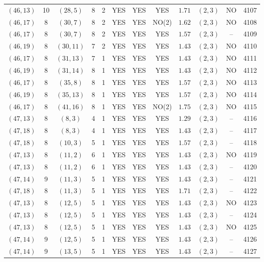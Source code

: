 \begin{longtable}{|c|c|c|c|c|c|c|c|c|c|c|c|}
$(46,13)$ & 10 & $(28,5)$ & 8 & 2 & YES & YES & YES & $1.71$ & $(2,3)$ & NO & 4107\\
$(46,17)$ & 8 & $(30,7)$ & 8 & 2 & YES & YES & NO(2) & $1.62$ & $(2,3)$ & NO & 4108\\
$(46,17)$ & 8 & $(30,7)$ & 8 & 2 & YES & YES & YES & $1.57$ & $(2,3)$ & -- & 4109\\
$(46,19)$ & 8 & $(30,11)$ & 7 & 2 & YES & YES & YES & $1.43$ & $(2,3)$ & NO & 4110\\
$(46,17)$ & 8 & $(31,13)$ & 7 & 1 & YES & YES & YES & $1.43$ & $(2,3)$ & NO & 4111\\
$(46,19)$ & 8 & $(31,14)$ & 8 & 1 & YES & YES & YES & $1.43$ & $(2,3)$ & NO & 4112\\
$(46,17)$ & 8 & $(35,8)$ & 8 & 1 & YES & YES & YES & $1.57$ & $(2,3)$ & NO & 4113\\
$(46,19)$ & 8 & $(35,13)$ & 8 & 1 & YES & YES & YES & $1.57$ & $(2,3)$ & NO & 4114\\
$(46,17)$ & 8 & $(41,16)$ & 8 & 1 & YES & YES & NO(2) & $1.75$ & $(2,3)$ & NO & 4115\\
$(47,13)$ & 8 & $(8,3)$ & 4 & 1 & YES & YES & YES & $1.29$ & $(2,3)$ & -- & 4116\\
$(47,18)$ & 8 & $(8,3)$ & 4 & 1 & YES & YES & YES & $1.43$ & $(2,3)$ & -- & 4117\\
$(47,18)$ & 8 & $(10,3)$ & 5 & 1 & YES & YES & YES & $1.57$ & $(2,3)$ & -- & 4118\\
$(47,13)$ & 8 & $(11,2)$ & 6 & 1 & YES & YES & YES & $1.43$ & $(2,3)$ & NO & 4119\\
$(47,13)$ & 8 & $(11,2)$ & 6 & 1 & YES & YES & YES & $1.43$ & $(2,3)$ & -- & 4120\\
$(47,14)$ & 9 & $(11,3)$ & 5 & 1 & YES & YES & YES & $1.43$ & $(2,3)$ & -- & 4121\\
$(47,18)$ & 8 & $(11,3)$ & 5 & 1 & YES & YES & YES & $1.71$ & $(2,3)$ & -- & 4122\\
$(47,13)$ & 8 & $(12,5)$ & 5 & 1 & YES & YES & YES & $1.43$ & $(2,3)$ & NO & 4123\\
$(47,13)$ & 8 & $(12,5)$ & 5 & 1 & YES & YES & YES & $1.43$ & $(2,3)$ & -- & 4124\\
$(47,13)$ & 8 & $(12,5)$ & 5 & 1 & YES & YES & YES & $1.43$ & $(2,3)$ & NO & 4125\\
$(47,14)$ & 9 & $(12,5)$ & 5 & 1 & YES & YES & YES & $1.43$ & $(2,3)$ & -- & 4126\\
$(47,14)$ & 9 & $(13,5)$ & 5 & 1 & YES & YES & YES & $1.43$ & $(2,3)$ & -- & 4127\\

\end{longtable}
